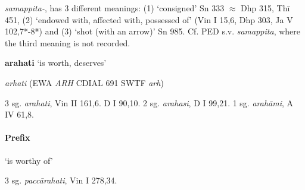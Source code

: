 \documentclass[11pt]{article}
\newcommand*\ṛ{r\symbol{"325}}
\newcommand*\Ṛ{R\symbol{"325}}
\newcommand*\ṝ{r\symbol{"304}\symbol{"325}}
\newcommand*\Ṝ{R\symbol{"304}\symbol{"325}}
\newcommand*\ḷ{l\symbol{"325}}
\newcommand*\ḹ{l\symbol{"304}\symbol{"325}}
\newcommand*\Ḷ{L\symbol{"325}}
\newcommand*\Ḹ{L\symbol{"304}\symbol{"325}}
\begin{document}
\textit{samappita-}, has 3 different meanings:
(1) `consigned' Sn 333 $\approx$ Dhp 315, Thī 451,
(2) `endowed with, affected with, possessed of' (Vin I 15,6, Dhp 303, Ja V 102,7*-8*)
and (3) `shot (with an arrow)' Sn 985.
Cf. PED s.v. \textit{samappita}, where the third meaning is not recorded.\\



%
%
\begin{center}
{\Large
\textbf{arahati} `is worth, deserves'
}
\end{center}
\begin{description}[leftmargin=\parindent]
\item[ety.]
\textit{arhati}
(EWA  \textit{ARH}
CDIAL 691
SWTF \textit{arh})
\end{description}
\begin{description}[leftmargin=\parindent]
\item[pres.]3 sg. \textit{arahati}, Vin II 161,6. D I 90,10.
2 sg. \textit{arahasi}, D I 99,21.
1 sg. \textit{arahāmi}, A IV 61,8.
\end{description}
\paragraph*{Prefix}
\begin{description}[leftmargin=\parindent]
\item[paṭi] `is worthy of'
\item[pres] 3 sg. \textit{paccārahati}, Vin I 278,34.\\
\end{description}
\end{document}
